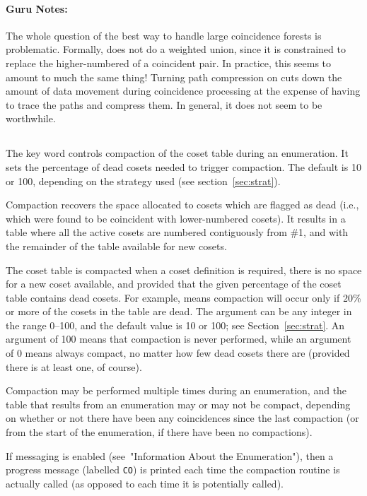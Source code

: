 \paragraph{Guru Notes:}
The whole question of the best way to handle large coincidence forests is
  problematic.
Formally, {\ace} does not do a weighted union, since it is constrained to
  replace the higher-numbered of a coincident pair.
In practice, this seems to amount to much the same thing!
Turning path compression on cuts down the amount of data movement during
  coincidence processing at the expense of having to trace the paths and
  compress them.
In general, it does not seem to be worthwhile.

\subsection{}
\label{cmd:compaction}
The key word  controls compaction of the coset table during an
  enumeration.
It sets the percentage of dead cosets needed to trigger
compaction. The default is 10 or 100, depending on the strategy used
(see section~\ref{sec:strat}).

Compaction recovers the space allocated to cosets which are flagged as dead
(i.e., which were found to be coincident with lower-numbered cosets).  It
results in a table where all the active cosets are numbered contiguously
from \#1, and with the remainder of the table available for new cosets.

The coset table is compacted when a coset definition is required, there is
  no space for a new coset available, and provided that the given 
  percentage of the coset table contains dead cosets.
For example,  means compaction will occur only if 20\% or more
  of the cosets in the table are dead.
The argument can be any integer in the range 0--100, and the default value
  is 10 or 100; see Section~\ref{sec:strat}.
An argument of 100 means that compaction is never performed, while an
  argument of 0 means always compact, no matter how few dead cosets there
  are (provided there is at least one, of course).

Compaction may be performed multiple times during an enumeration, and the
  table that results from an enumeration may or may not be compact,
  depending on whether or not there have been any coincidences since the
  last compaction (or from the start of the enumeration, if there have been
  no compactions).

If messaging is enabled (see~"Information About the Enumeration"), then a
progress message (labelled {\tt CO}) is printed each time the compaction routine
is actually called (as opposed to each time it is potentially called).


